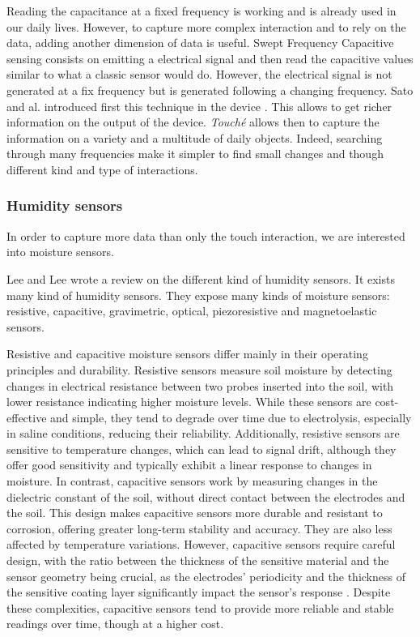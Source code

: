 Reading the capacitance at a fixed frequency is working and is already used in our daily lives.
However, to capture more complex interaction and to rely on the data, adding another dimension of data is useful.
Swept Frequency Capacitive sensing consists on emitting a electrical signal and then read the capacitive values
similar to what a classic sensor would do. However, the electrical signal is not generated at a fix frequency
but is generated following a changing frequency.
Sato and al. introduced first this technique in the  device \cite{satoToucheEnhancingTouch2012}.
This allows to get richer information on the output of the device. \textit{Touché} allows then to capture
the information on a variety and a multitude of daily objects.
Indeed, searching through many frequencies make it simpler to find small changes and though different kind and type
of interactions.

\subsubsection{Humidity sensors}

In order to capture more data than only the touch interaction, we are interested into moisture sensors.

Lee and Lee \cite{leeHumiditySensorsReview2005} wrote a review on the different kind of humidity sensors. It exists many kind of humidity sensors. They expose many kinds of moisture sensors: resistive, capacitive, gravimetric, optical, piezoresistive and magnetoelastic sensors.

Resistive and capacitive moisture sensors differ mainly in their operating principles and durability. Resistive sensors measure soil moisture by detecting changes in electrical resistance between two probes inserted into the soil, with lower resistance indicating higher moisture levels. While these sensors are cost-effective and simple, they tend to degrade over time due to electrolysis, especially in saline conditions, reducing their reliability. Additionally, resistive sensors are sensitive to temperature changes, which can lead to signal drift, although they offer good sensitivity and typically exhibit a linear response to changes in moisture. In contrast, capacitive sensors work by measuring changes in the dielectric constant of the soil, without direct contact between the electrodes and the soil. This design makes capacitive sensors more durable and resistant to corrosion, offering greater long-term stability and accuracy. They are also less affected by temperature variations. However, capacitive sensors require careful design, with the ratio between the thickness of the sensitive material and the sensor geometry being crucial, as the electrodes' periodicity and the thickness of the sensitive coating layer significantly impact the sensor's response \cite{armankuzubasogluRecentStudiesHumidity2022}. Despite these complexities, capacitive sensors tend to provide more reliable and stable readings over time, though at a higher cost.


